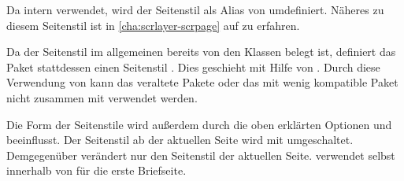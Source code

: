 \begin{description}
  Da  intern
  \hyperref[cha:scrlayer-scrpage]{} verwendet, wird
  der Seitenstil  als Alias von
   umdefiniert. Näheres
  zu diesem Seitenstil ist in \autoref{cha:scrlayer-scrpage} auf
   zu erfahren.
\item[{\PageStyle{plain.letter}}]
  Da der Seitenstil  im allgemeinen bereits von den Klassen
  belegt ist, definiert das Paket 
  stattdessen einen Seitenstil . Dies geschieht mit
  Hilfe von \hyperref[cha:scrlayer-scrpage]{}.
  Durch diese Verwendung von
  \hyperref[cha:scrlayer-scrpage]{} kann das
  veraltete Pakete  oder das mit
  \KOMAScript{} wenig kompatible Paket
   nicht zusammen mit
   verwendet werden.
\end{description}

Die Form der Seitenstile wird außerdem durch die oben erklärten
Optionen
 und
beeinflusst. Der Seitenstil ab der aktuellen Seite wird mit 
umgeschaltet. Demgegenüber verändert  nur den Seitenstil
der aktuellen Seite. \KOMAScript{} verwendet
 selbst innerhalb von
 für die erste Briefseite.

